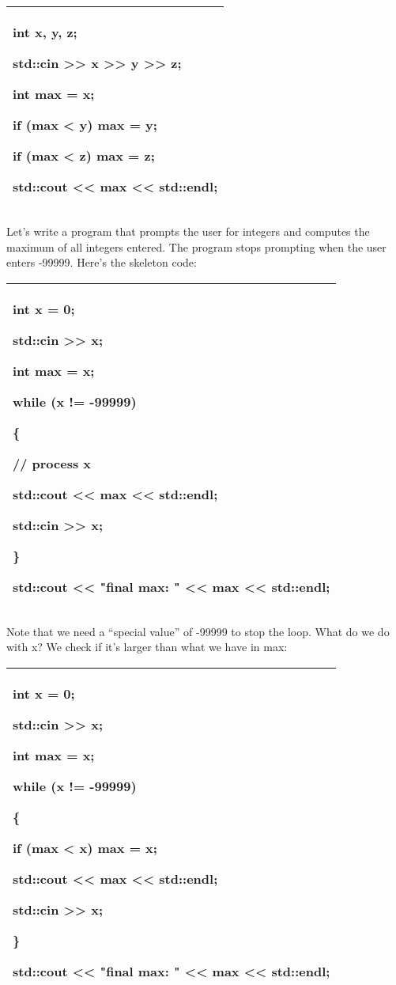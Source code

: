 \documentclass[
]{article}
\begin{document}
\begin{longtable}[]{@{}l@{}}
\toprule
\endhead
\begin{minipage}[t]{0.97\columnwidth}\raggedright
int x, y, z;

std::cin \textgreater\textgreater{} x \textgreater\textgreater{} y
\textgreater\textgreater{} z;

int max = x;

if (max \textless{} y) max = y;

if (max \textless{} z) max = z;

std::cout \textless\textless{} max \textless\textless{} std::endl;\strut
\end{minipage}\tabularnewline
\bottomrule
\end{longtable}

Let's write a program that prompts the user for integers and computes
the maximum of all integers entered. The program stops prompting when
the user enters -99999. Here's the skeleton code:

\begin{longtable}[]{@{}l@{}}
\toprule
\endhead
\begin{minipage}[t]{0.97\columnwidth}\raggedright
int x = 0;

std::cin \textgreater\textgreater{} x;

int max = x;

while (x != -99999)

\{

// process x

std::cout \textless\textless{} max \textless\textless{} std::endl;

std::cin \textgreater\textgreater{} x;

\}

std::cout \textless\textless{} "final max: " \textless\textless{} max
\textless\textless{} std::endl;\strut
\end{minipage}\tabularnewline
\bottomrule
\end{longtable}

Note that we need a ``special value'' of -99999 to stop the loop. What
do we do with x? We check if it's larger than what we have in max:

\begin{longtable}[]{@{}l@{}}
\toprule
\endhead
\begin{minipage}[t]{0.97\columnwidth}\raggedright
int x = 0;

std::cin \textgreater\textgreater{} x;

int max = x;

while (x != -99999)

\{

\textbf{if (max \textless{} x) max = x;}

std::cout \textless\textless{} max \textless\textless{} std::endl;

std::cin \textgreater\textgreater{} x;

\}

std::cout \textless\textless{} "final max: " \textless\textless{} max
\textless\textless{} std::endl;\strut
\end{minipage}\tabularnewline
\bottomrule
\end{longtable}
\end{document}
